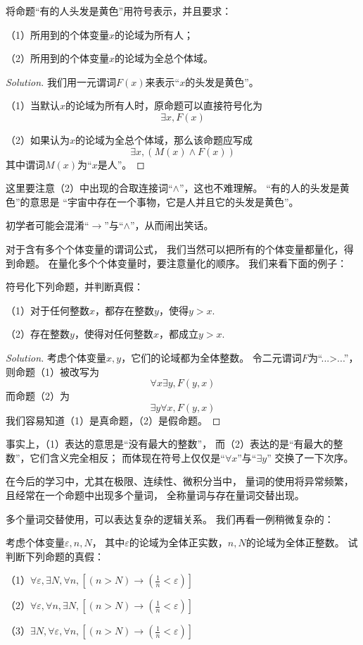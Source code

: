 \begin{example}
将命题“有的人头发是黄色”用符号表示，并且要求：

（1）所用到的个体变量$x$的论域为所有人；

（2）所用到的个体变量$x$的论域为全总个体域。
\end{example}

\begin{proof}[Solution]
我们用一元谓词$F(x)$来表示“$x$的头发是黄色”。

（1）当默认$x$的论域为所有人时，原命题可以直接符号化为
$$\exists x,F(x)$$

（2）如果认为$x$的论域为全总个体域，那么该命题应写成
$$\exists x,(M(x)\wedge F(x))$$
其中谓词$M(x)$为“$x$是人”。
\end{proof}

这里要注意（2）中出现的合取连接词“$\wedge$”，这也不难理解。
“有的人的头发是黄色”的意思是
“宇宙中存在一个事物，它是人并且它的头发是黄色”。

初学者可能会混淆“$\rightarrow$”与“$\wedge$”，从而闹出笑话。\vs

对于含有多个个体变量的谓词公式，
我们当然可以把所有的个体变量都量化，得到命题。
在量化多个个体变量时，要注意量化的顺序。
我们来看下面的例子：

\begin{example}符号化下列命题，并判断真假：

（1）对于任何整数$x$，都存在整数$y$，使得$y>x$.

（2）存在整数$y$，使得对任何整数$x$，都成立$y>x$.
\end{example}

\begin{proof}[Solution]
考虑个体变量$x,y$，它们的论域都为全体整数。
令二元谓词$F$为“...>...”，则命题（1）被改写为
$$\forall x\exists y,F(y,x)$$
而命题（2）为
$$\exists y\forall x,F(y,x)$$
我们容易知道（1）是真命题，（2）是假命题。
\end{proof}

事实上，（1）表达的意思是“没有最大的整数”，
而（2）表达的是“有最大的整数”，它们含义完全相反；
而体现在符号上仅仅是“$\forall x$”与“$\exists y$”
交换了一下次序。

在今后的学习中，尤其在极限、连续性、微积分当中，
量词的使用将异常频繁，且经常在一个命题中出现多个量词，
全称量词与存在量词交替出现。

多个量词交替使用，可以表达复杂的逻辑关系。
我们再看一例稍微复杂的：

\begin{example}考虑个体变量$\varepsilon,n,N$，
其中$\varepsilon$的论域为全体正实数，$n,N$的论域为全体正整数。
试判断下列命题的真假：

（1）$\forall\varepsilon,\exists N,\forall n,[(n>N)
\rightarrow(\frac{1}{n}<\varepsilon)]$

（2）$\forall\varepsilon,\forall n,\exists N,[(n>N)
\rightarrow(\frac{1}{n}<\varepsilon)]$

（3）$\exists N,\forall\varepsilon,\forall n,[(n>N)
\rightarrow(\frac{1}{n}<\varepsilon)]$
\end{example}

